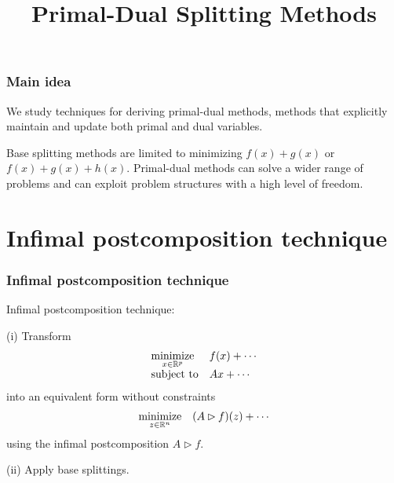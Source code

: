 \documentclass[10pt,mathserif]{beamer}
\title{\large \bfseries Primal-Dual Splitting Methods}
\begin{document}
\frame{
\thispagestyle{empty}
\titlepage
}

\begin{frame}
\frametitle{Main idea}

We study techniques for deriving primal-dual methods, methods that explicitly maintain and update both primal and dual variables.

\vspace{0.2in}
Base splitting methods are limited to minimizing $f(x)+g(x)$ or $f(x)+g(x)+h(x)$.
Primal-dual methods can solve a wider range of problems and can exploit problem structures with a high level of freedom.






\end{frame}



\section{Infimal postcomposition technique}

\begin{frame}
\frametitle{Infimal postcomposition technique}
Infimal postcomposition technique:
\vspace{0.2in}

 (i) Transform 
\[
\begin{array}{ll}
\underset{x\in \mathbb{R}^{p}}{\mbox{minimize}}&f(x)+\cdots\\
\mbox{subject to}&Ax+\cdots
\end{array}
\]
into an equivalent form without constraints
\[
\begin{array}{ll}
\underset{z\in \mathbb{R}^n}{\mbox{minimize}}&(A\rhd f)(z)+\cdots
\end{array}
\]
%
using the infimal postcomposition $A\rhd f$.
\vspace{0.2in}

(ii) Apply base splittings.
\end{frame}
\end{document}

